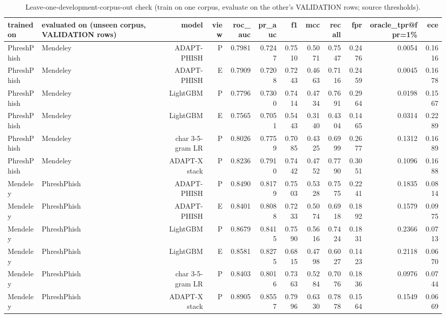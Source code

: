 \begin{table}[t]
\centering
\scriptsize
\caption{Leave-one-development-corpus-out check (train on one corpus, evaluate on the other's VALIDATION rows; source thresholds).}
\label{tab:loco}
\begin{tabular}{llrrrrrrrrrr}
\toprule
trained on & evaluated on (unseen corpus, VALIDATION rows) & model & view & roc\_auc & pr\_auc & f1 & mcc & recall & fpr & oracle\_tpr@fpr=1\% & ece \\
\midrule
PhreshPhish & Mendeley & ADAPT-PHISH & P & 0.7981 & 0.7247 & 0.7510 & 0.5071 & 0.7547 & 0.2476 & 0.0054 & 0.1616 \\
PhreshPhish & Mendeley & ADAPT-PHISH & E & 0.7909 & 0.7208 & 0.7243 & 0.4663 & 0.7116 & 0.2459 & 0.0045 & 0.1678 \\
PhreshPhish & Mendeley & LightGBM & P & 0.7796 & 0.7300 & 0.7414 & 0.4734 & 0.7691 & 0.2964 & 0.0198 & 0.1567 \\
PhreshPhish & Mendeley & LightGBM & E & 0.7565 & 0.7051 & 0.5443 & 0.3140 & 0.4304 & 0.1465 & 0.0314 & 0.2289 \\
PhreshPhish & Mendeley & char 3-5-gram LR & P & 0.8026 & 0.7759 & 0.7085 & 0.4325 & 0.6999 & 0.2677 & 0.1312 & 0.1689 \\
PhreshPhish & Mendeley & ADAPT-X stack & P & 0.8236 & 0.7910 & 0.7442 & 0.4752 & 0.7790 & 0.3051 & 0.1096 & 0.1688 \\
Mendeley & PhreshPhish & ADAPT-PHISH & P & 0.8490 & 0.8179 & 0.7503 & 0.5328 & 0.7575 & 0.2241 & 0.1835 & 0.0814 \\
Mendeley & PhreshPhish & ADAPT-PHISH & E & 0.8401 & 0.8088 & 0.7233 & 0.5074 & 0.6918 & 0.1892 & 0.1579 & 0.0975 \\
Mendeley & PhreshPhish & LightGBM & P & 0.8679 & 0.8415 & 0.7590 & 0.5616 & 0.7424 & 0.1831 & 0.2366 & 0.0713 \\
Mendeley & PhreshPhish & LightGBM & E & 0.8581 & 0.8275 & 0.6815 & 0.4798 & 0.6027 & 0.1423 & 0.2118 & 0.0670 \\
Mendeley & PhreshPhish & char 3-5-gram LR & P & 0.8403 & 0.8016 & 0.7363 & 0.5284 & 0.7076 & 0.1836 & 0.0976 & 0.0744 \\
Mendeley & PhreshPhish & ADAPT-X stack & P & 0.8905 & 0.8557 & 0.7996 & 0.6330 & 0.7878 & 0.1564 & 0.1549 & 0.0669 \\
\bottomrule
\end{tabular}
\end{table}